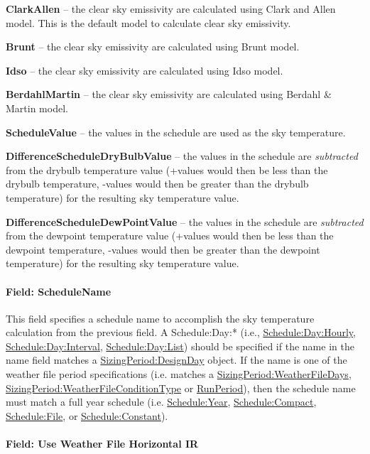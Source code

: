 \textbf{ClarkAllen} -- the clear sky emissivity are calculated using Clark and Allen model. This is the default model to calculate clear sky emissivity.

\textbf{Brunt} -- the clear sky emissivity are calculated using Brunt model.

\textbf{Idso} -- the clear sky emissivity are calculated using Idso model.

\textbf{BerdahlMartin} -- the clear sky emissivity are calculated using Berdahl \& Martin model.

\textbf{ScheduleValue} -- the values in the schedule are used as the sky temperature.

\textbf{DifferenceScheduleDryBulbValue} -- the values in the schedule are \emph{subtracted} from the drybulb temperature value (+values would then be less than the drybulb temperature, -values would then be greater than the drybulb temperature) for the resulting sky temperature value.

\textbf{DifferenceScheduleDewPointValue} -- the values in the schedule are \emph{subtracted} from the dewpoint temperature value (+values would then be less than the dewpoint temperature, -values would then be greater than the dewpoint temperature) for the resulting sky temperature value.

\paragraph{Field: ScheduleName}\label{field-schedulename}

This field specifies a schedule name to accomplish the sky temperature calculation from the previous field. A Schedule:Day:* (i.e., \hyperref[scheduledayhourly]{Schedule:Day:Hourly}, \hyperref[scheduledayinterval]{Schedule:Day:Interval}, \hyperref[scheduledaylist]{Schedule:Day:List}) should be specified if the name in the name field matches a \hyperref[sizingperioddesignday]{SizingPeriod:DesignDay} object. If the name is one of the weather file period specifications (i.e. matches a \hyperref[sizingperiodweatherfiledays]{SizingPeriod:WeatherFileDays}, \hyperref[sizingperiodweatherfileconditiontype]{SizingPeriod:WeatherFileConditionType} or \hyperref[runperiod]{RunPeriod}), then the schedule name must match a full year schedule (i.e. \hyperref[scheduleyear]{Schedule:Year}, \hyperref[schedulecompact]{Schedule:Compact}, \hyperref[schedulefile]{Schedule:File}, or \hyperref[scheduleconstant]{Schedule:Constant}).

\paragraph{Field: Use Weather File Horizontal IR}\label{field-use-weather-file-hori-ir}

